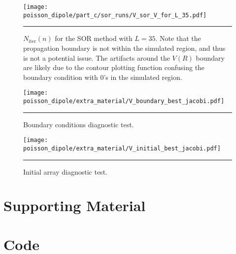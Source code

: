 \documentclass[notitlepage,aps,prd,nofootinbib]{revtex4-1}
\begin{document}
\begin{figure}[!htbc]
  \centering
  \texttt{[image: poisson\_dipole/part\_c/sor\_runs/V\_sor\_V\_for\_L\_35.pdf]}
	{\par\nobreak\rule[9pt]{35em}{0.5pt}\vspace{-5mm}}
	\caption{$N_{\mathrm{iter}}\left(n\right)$ for the SOR method with $L = 35$. Note that the propagation boundary is not within the simulated region, and thus is not a potential issue. The artifacts around the $V\left(R\right)$ boundary are likely due to the contour plotting function confusing the boundary condition with 0's in the simulated region.}
	\label{fig:propegation_test_SOR}
\end{figure}


\clearpage
\begin{figure}[!htbc]
  \centering
  \texttt{[image: poisson\_dipole/extra\_material/V\_boundary\_best\_jacobi.pdf]}
	{\par\nobreak\rule[9pt]{35em}{0.5pt}\vspace{-5mm}}
	\caption{Boundary conditions diagnostic test.}
	\label{fig:boundary_test}
\end{figure}

\begin{figure}[!htbc]
  \centering
  \texttt{[image: poisson\_dipole/extra\_material/V\_initial\_best\_jacobi.pdf]}
	{\par\nobreak\rule[9pt]{35em}{0.5pt}\vspace{-5mm}}
	\caption{Initial array diagnostic test.}
	\label{fig:initial_array_test}
\end{figure}


\clearpage
\section{Supporting Material}
\label{sec:Supporting_Material}




\clearpage



\clearpage
\section{Code}
\label{sec:code}


\clearpage

\end{document}
